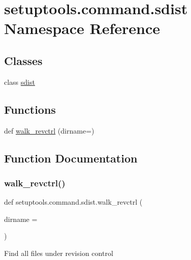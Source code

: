 \hypertarget{namespacesetuptools_1_1command_1_1sdist}{}\section{setuptools.\+command.\+sdist Namespace Reference}
\label{namespacesetuptools_1_1command_1_1sdist}
\subsection*{Classes}
\begin{DoxyCompactItemize}
\item 
class \hyperlink{classsetuptools_1_1command_1_1sdist_1_1sdist}{sdist}
\end{DoxyCompactItemize}
\subsection*{Functions}
\begin{DoxyCompactItemize}
\item 
def \hyperlink{namespacesetuptools_1_1command_1_1sdist_a2c73b1c3e885ffe491953225a8b5a130}{walk\+\_\+revctrl} (dirname=\textquotesingle{}\textquotesingle{})
\end{DoxyCompactItemize}


\subsection{Function Documentation}
\mbox{\label{namespacesetuptools_1_1command_1_1sdist_a2c73b1c3e885ffe491953225a8b5a130}} 
\subsubsection{\texorpdfstring{walk\+\_\+revctrl()}{walk\_revctrl()}}
{\footnotesize\ttfamily def setuptools.\+command.\+sdist.\+walk\+\_\+revctrl (\begin{DoxyParamCaption}\item[{}]{dirname = {\ttfamily \textquotesingle{}\textquotesingle{}} }\end{DoxyParamCaption})}

\begin{DoxyVerb}Find all files under revision control\end{DoxyVerb}
 